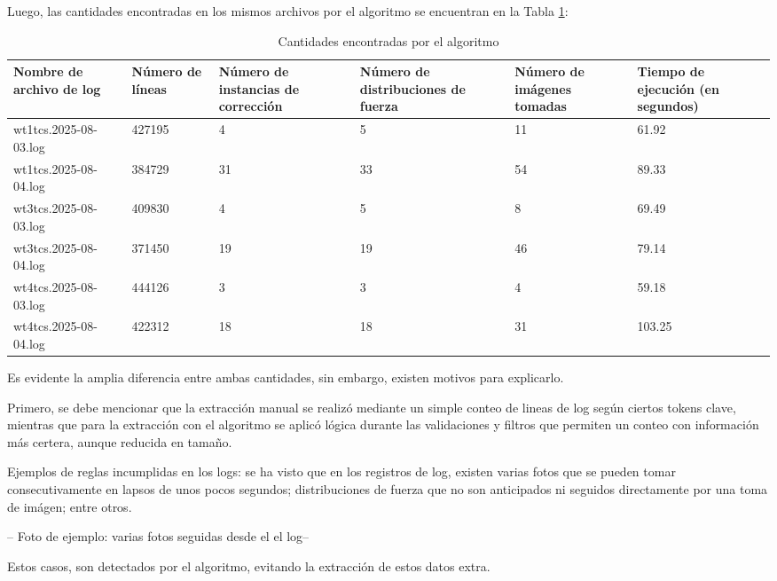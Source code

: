 Luego, las cantidades encontradas en los mismos archivos por el algoritmo se encuentran en la Tabla \ref{table:auto}:


\begin{table}[h]
    \centering
    \caption{\label{table:auto} Cantidades encontradas por el algoritmo}
    \begin{tabular}{|p{2.3cm}|p{2.3cm}|p{2.3cm}|p{2.3cm}|p{2.3cm}|p{2.3cm}|}
        \hline
        Nombre de archivo de log & Número de líneas & Número de instancias de corrección & Número de distribuciones de fuerza & Número de imágenes tomadas & Tiempo de ejecución (en segundos) \\
        \hline
        wt1tcs.2025-08-03.log & 427195 & 4 & 5 & 11 & 61.92 \\
        \hline
        wt1tcs.2025-08-04.log & 384729 & 31 & 33 & 54 & 89.33 \\
        \hline
        wt3tcs.2025-08-03.log & 409830 & 4 & 5 & 8 & 69.49 \\
        \hline
        wt3tcs.2025-08-04.log & 371450 & 19 & 19 & 46 & 79.14 \\
        \hline
        wt4tcs.2025-08-03.log & 444126 & 3 & 3 & 4 & 59.18 \\
        \hline
        wt4tcs.2025-08-04.log & 422312 & 18 & 18 & 31 & 103.25 \\
        \hline
    \end{tabular}
\end{table}

Es evidente la amplia diferencia entre ambas cantidades, sin embargo, existen motivos para explicarlo.

Primero, se debe mencionar que la extracción manual se realizó mediante un simple conteo de lineas de log según ciertos tokens clave, mientras que para la extracción con el algoritmo se aplicó lógica durante las validaciones y filtros que permiten un conteo con información más certera, aunque reducida en tamaño.

Ejemplos de reglas incumplidas en los logs: se ha visto que en los registros de log, existen varias fotos que se pueden tomar consecutivamente en lapsos de unos pocos segundos; distribuciones de fuerza que no son anticipados ni seguidos directamente por una toma de imágen; entre otros.

-- Foto de ejemplo: varias fotos seguidas desde el el log--

Estos casos, son detectados por el algoritmo, evitando la extracción de estos datos extra.

